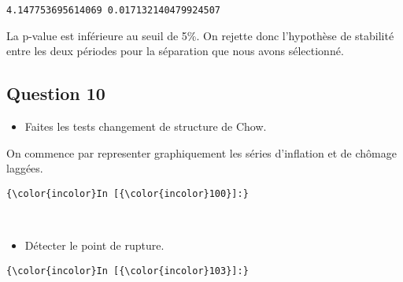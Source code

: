 \documentclass[11pt]{article}
\providecommand{\tightlist}{%
      \setlength{\itemsep}{0pt}\setlength{\parskip}{0pt}}
\begin{document}
    \begin{Verbatim}[commandchars=\\\{\}]
4.147753695614069 0.017132140479924507

    \end{Verbatim}

    La p-value est inférieure au seuil de 5\%. On rejette donc l'hypothèse
de stabilité entre les deux périodes pour la séparation que nous avons
sélectionné.

    \subsection{Question 10}\label{question-10}

\begin{itemize}
\tightlist
\item
  Faites les tests changement de structure de Chow.
\end{itemize}

    On commence par representer graphiquement les séries d'inflation et de
chômage laggées.

    \begin{Verbatim}[commandchars=\\\{\}]
{\color{incolor}In [{\color{incolor}100}]:} 
\end{Verbatim}


    \begin{center}
    \end{center}
    { \hspace*{\fill} \\}
    
    \begin{itemize}
\tightlist
\item
  Détecter le point de rupture.
\end{itemize}

    \begin{Verbatim}[commandchars=\\\{\}]
{\color{incolor}In [{\color{incolor}103}]:} 
\end{Verbatim}


    \begin{center}
    \end{center}
    { \hspace*{\fill} \\}
    
\end{document}
